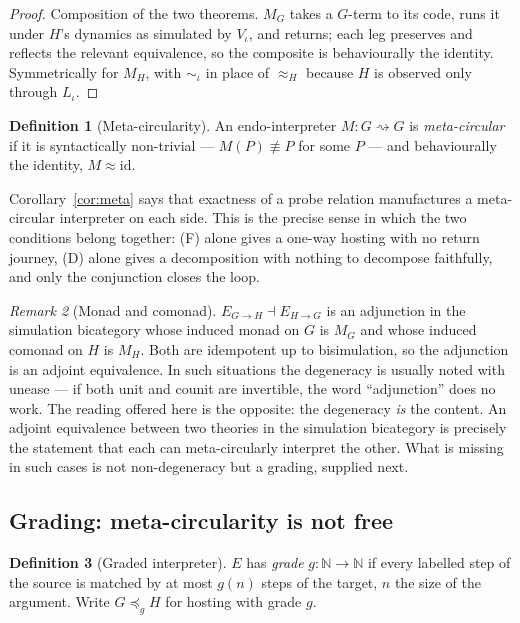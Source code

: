 \documentclass[11pt,a4paper]{article}
\theoremstyle{definition}
\newtheorem{definition}{Definition}[section]
\theoremstyle{plain}
\theoremstyle{remark}
\newtheorem{remark}[definition]{Remark}
\newcommand{\bisim}{\approx}
\begin{document}
\begin{proof}
Composition of the two theorems. $M_G$ takes a $G$-term to its code, runs it under
$H$'s dynamics as simulated by $V_\iota$, and returns; each leg preserves and
reflects the relevant equivalence, so the composite is behaviourally the identity.
Symmetrically for $M_H$, with $\sim_\iota$ in place of $\bisim_H$ because $H$ is
observed only through $L_\iota$.
\end{proof}

\begin{definition}[Meta-circularity]
\label{def:metacirc}
An endo-interpreter $M : G \rightsquigarrow G$ is \emph{meta-circular} if it is
syntactically non-trivial --- $M(P) \not\equiv P$ for some $P$ --- and behaviourally
the identity, $M \bisim \mathrm{id}$.
\end{definition}

Corollary~\ref{cor:meta} says that exactness of a probe relation manufactures a
meta-circular interpreter on each side. This is the precise sense in which the two
conditions belong together: (F) alone gives a one-way hosting with no return
journey, (D) alone gives a decomposition with nothing to decompose faithfully, and
only the conjunction closes the loop.

\begin{remark}[Monad and comonad]
\label{rem:monad}
$E_{G\to H} \dashv E_{H\to G}$ is an adjunction in the simulation bicategory whose
induced monad on $G$ is $M_G$ and whose induced comonad on $H$ is $M_H$. Both are
idempotent up to bisimulation, so the adjunction is an adjoint equivalence. In
such situations the degeneracy is usually noted with unease --- if both unit and
counit are invertible, the word ``adjunction'' does no work. The reading offered here
is the opposite: the degeneracy \emph{is} the content. An adjoint equivalence between
two theories in the simulation bicategory is precisely the statement that each can
meta-circularly interpret the other. What is missing in such cases is not
non-degeneracy but a grading, supplied next.
\end{remark}

\subsection{Grading: meta-circularity is not free}
\label{sec:meta-grade}

\begin{definition}[Graded interpreter]
\label{def:graded}
$E$ has \emph{grade} $g : \mathbb{N} \to \mathbb{N}$ if every labelled step of the
source is matched by at most $g(n)$ steps of the target, $n$ the size of the
argument. Write $G \preceq_g H$ for hosting with grade $g$.
\end{definition}
\end{document}
